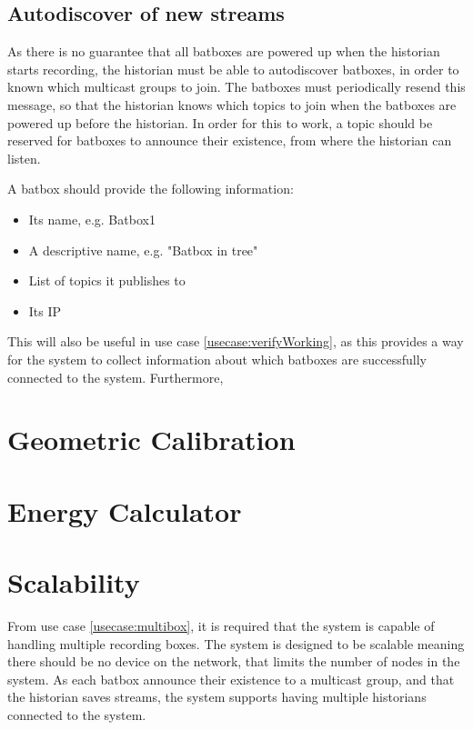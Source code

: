 \subsection{Autodiscover of new streams}
As there is no guarantee that all batboxes are powered up when the historian starts recording, the historian must be able to autodiscover batboxes, in order to known which multicast groups to join. The batboxes must periodically resend this message, so that the historian knows which topics to join when the batboxes are powered up before the historian.
 In order for this to work, a topic should be reserved for batboxes to announce their existence, from where the historian can listen. 

A batbox should provide the following information:
\begin{itemize}
	\item Its name, e.g. Batbox1
	\item A descriptive name, e.g. "Batbox in tree"
	\item List of topics it publishes to
	\item Its IP
\end{itemize}
 

This will also be useful in use case \ref{usecase:verifyWorking}, as this provides a way for the system to collect information about which batboxes are successfully connected to the system.
Furthermore, 


\section{Geometric Calibration}


\section{Energy Calculator}

\section{Scalability}
From use case \ref{usecase:multibox}, it is required that the system is capable of handling multiple recording boxes. The system is designed to be scalable meaning there should be no device on the network, that limits the number of nodes in the system. As each batbox announce their existence to a multicast group, and that the historian saves streams, the system supports having multiple historians connected to the system. 

